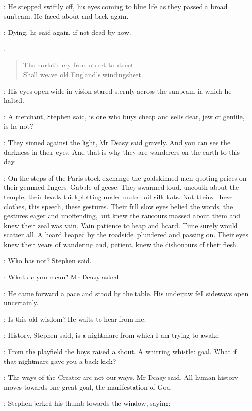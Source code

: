 :
He stepped swiftly off, his eyes coming to blue life as they passed a
broad sunbeam. He faced about and back again.

\deasy:
Dying, he said again, if not dead by now.

\StephenInt:
\begin{verse}
    The harlot's cry from street to street \\
    Shall weave old England's windingsheet.
\end{verse}

:
His eyes open wide in vision stared sternly across the sunbeam in
which he halted.

\Stephen:
A merchant, Stephen said, is one who buys cheap and sells dear, jew or
gentile, is he not?

\deasy:
They sinned against the light, Mr Deasy said gravely. And you can see
the darkness in their eyes. And that is why they are wanderers on the
earth to this day.

\StephenInt:
On the steps of the Paris stock exchange the goldskinned men quoting
prices on their gemmed fingers. Gabble of geese. They swarmed loud,
uncouth about the temple, their heads thickplotting under maladroit silk
hats. Not theirs: these clothes, this speech, these gestures. Their full
slow eyes belied the words, the gestures eager and unoffending, but knew
the rancours massed about them and knew their zeal was vain. Vain patience
to heap and hoard. Time surely would scatter all. A hoard heaped by the
roadside: plundered and passing on. Their eyes knew their years of
wandering and, patient, knew the dishonours of their flesh.

\Stephen:
Who has not? Stephen said.

\deasy:
What do you mean? Mr Deasy asked.

:
He came forward a pace and stood by the table. His underjaw fell
sideways open uncertainly.

\StephenInt:
Is this old wisdom? He waits to hear from me.

\Stephen:
History, Stephen said, is a nightmare from which I am trying to awake.

:
From the playfield the boys raised a shout. A whirring whistle: goal.
What if that nightmare gave you a back kick?

\deasy:
The ways of the Creator are not our ways, Mr Deasy said. All human
history moves towards one great goal, the manifestation of God.

:
Stephen jerked his thumb towards the window, saying:

